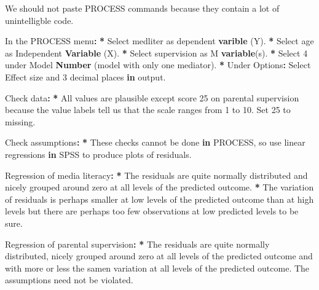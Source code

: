 \documentclass[a4paper]{book}
\newenvironment{Shaded}{\begin{snugshade}}{\end{snugshade}}
\newcommand{\KeywordTok}[1]{\textcolor[rgb]{0,0,0}{\textbf{#1}}}
\newcommand{\DecValTok}[1]{\textcolor[rgb]{0.00,0.00,0.00}{#1}}
\newcommand{\StringTok}[1]{\textcolor[rgb]{0.00,0.00,0.00}{#1}}
\newcommand{\ControlFlowTok}[1]{\textcolor[rgb]{0.00,0.00,0.00}{\textbf{#1}}}
\newcommand{\OperatorTok}[1]{\textcolor[rgb]{0.00,0.00,0.00}{\textbf{#1}}}
\newcommand{\ErrorTok}[1]{\textcolor[rgb]{0.00,0.00,0.00}{\textbf{#1}}}
\newcommand{\NormalTok}[1]{#1}
\theoremstyle{definition}
\theoremstyle{definition}
\theoremstyle{definition}
\theoremstyle{remark}
\begin{document}
\begin{Shaded}
\begin{Highlighting}[]
\NormalTok{We should not paste PROCESS commands because they contain a lot of}
\NormalTok{unintelligble code.}
  
\NormalTok{In the PROCESS menu}\OperatorTok{:}\StringTok{  }
\StringTok{    }
\ErrorTok{*}\StringTok{ }\NormalTok{Select medliter as dependent }\KeywordTok{varible}\NormalTok{ (Y).  }
\OperatorTok{*}\StringTok{ }\NormalTok{Select age as Independent }\KeywordTok{Variable}\NormalTok{ (X).  }
\OperatorTok{*}\StringTok{ }\NormalTok{Select supervision as M }\KeywordTok{variable}\NormalTok{(s).  }
\OperatorTok{*}\StringTok{ }\NormalTok{Select }\DecValTok{4}\NormalTok{ under Model }\KeywordTok{Number}\NormalTok{ (model with only one mediator).  }
\OperatorTok{*}\StringTok{ }\NormalTok{Under Options}\OperatorTok{:}\StringTok{ }\NormalTok{Select Effect size and }\DecValTok{3}\NormalTok{ decimal places }\ControlFlowTok{in}\NormalTok{ output.  }
  
\NormalTok{Check data}\OperatorTok{:}\StringTok{  }
\StringTok{  }
\ErrorTok{*}\StringTok{ }\NormalTok{All values are plausible except score }\DecValTok{25}\NormalTok{ on parental supervision because the}
\NormalTok{value labels tell us that the scale ranges from }\DecValTok{1}\NormalTok{ to }\DecValTok{10}\NormalTok{. Set }\DecValTok{25}\NormalTok{ to missing.}
  
\NormalTok{Check assumptions}\OperatorTok{:}\StringTok{  }
\StringTok{  }
\ErrorTok{*}\StringTok{ }\NormalTok{These checks cannot be done }\ControlFlowTok{in}\NormalTok{ PROCESS, so use linear regressions }\ControlFlowTok{in}\NormalTok{ SPSS to}
\NormalTok{produce plots of residuals.}
  
\NormalTok{Regression of media literacy}\OperatorTok{:}\StringTok{  }
\ErrorTok{*}\StringTok{ }\NormalTok{The residuals are quite normally distributed and nicely grouped around zero}
\NormalTok{at all levels of the predicted outcome.}
\OperatorTok{*}\StringTok{ }\NormalTok{The variation of residuals is perhaps smaller at low levels of the}
\NormalTok{predicted outcome than at high levels but there are perhaps too few}
\NormalTok{observations at low predicted levels to be sure.}
  
\NormalTok{Regression of parental supervision}\OperatorTok{:}\StringTok{  }
\ErrorTok{*}\StringTok{ }\NormalTok{The residuals are quite normally distributed, nicely grouped around zero at}
\NormalTok{all levels of the predicted outcome and with more or less the samen variation}
\NormalTok{at all levels of the predicted outcome. The assumptions need not be violated.}
  

\end{Highlighting}
\end{Shaded}
\end{document}
